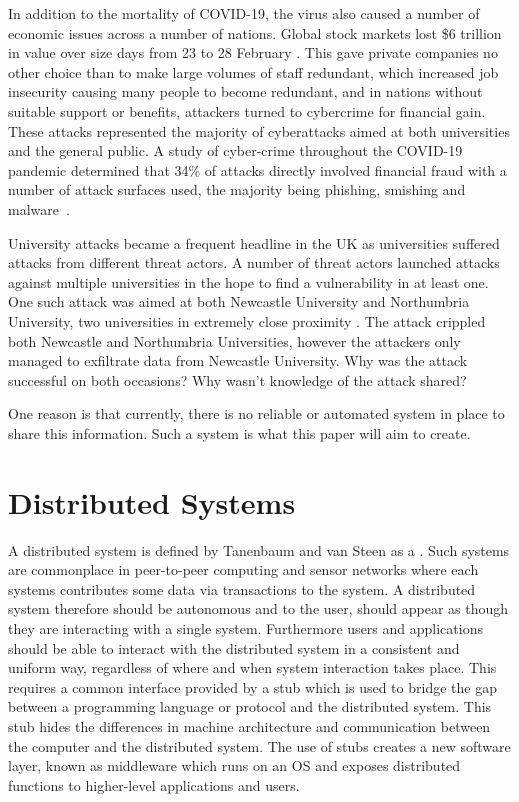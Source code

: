 \documentclass[a4paper, 11pt]{report}
\begin{document}
In addition to the mortality of COVID-19, the virus also caused a number of economic issues across a number of nations. Global stock markets lost \$6 trillion in value over size days from 23 to 28 February \cite{covspill}. This gave private companies no other choice than to make large volumes of staff redundant, which increased job insecurity causing many people to become redundant, and in nations without suitable support or benefits, attackers turned to cybercrime for financial gain. These attacks represented the majority of cyberattacks aimed at both universities and the general public. A study of cyber-crime throughout the COVID-19 pandemic determined that 34\% of attacks directly involved financial fraud with a number of attack surfaces used, the majority being \gls{phishing}, \gls{smishing} and \gls{malware}~\cite{diffattack}.

University attacks became a frequent headline in the UK as universities suffered attacks from different threat actors. A number of threat actors launched attacks against multiple universities in the hope to find a vulnerability in at least one. One such attack was aimed at both Newcastle University and Northumbria University, two universities in extremely close proximity \cite{newhack,norhack}. The attack crippled both Newcastle and Northumbria Universities, however the attackers only managed to exfiltrate data from Newcastle University. Why was the attack successful on both occasions? Why wasn't knowledge of the attack shared? 

One reason is that currently, there is no reliable or automated system in place to share this information. Such a system is what this paper will aim to create. 

\section{Distributed Systems} \label{distributed}
A distributed system is defined by Tanenbaum and van Steen as a  \cite{tanenbaumdist}. Such systems are commonplace in peer-to-peer computing and sensor networks where each systems contributes some data via transactions to the system. A distributed system therefore should be autonomous and to the user, should appear as though they are interacting with a single system. Furthermore users and applications should be able to interact with the distributed system in a consistent and uniform way, regardless of where and when system interaction takes place. This requires a common interface provided by a \gls{stub} which is used to bridge the gap between a programming language or protocol and the distributed system. This \gls{stub} hides the differences in machine architecture and communication between the computer and the distributed system. The use of \gls{stub}s creates a new software layer, known as \gls{middleware} which runs on an \acrfull{OS} and exposes distributed functions to higher-level applications and users.
\end{document}

